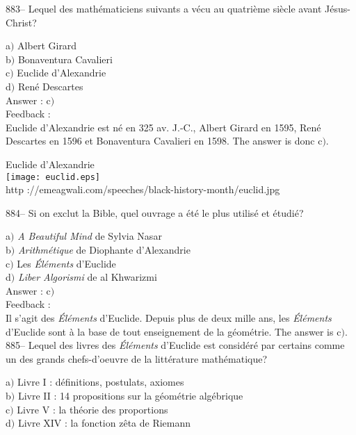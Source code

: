 \documentclass[letterpaper, 12pt]{article}
\begin{document}
883-- Lequel des math\'ematiciens suivants a v\'ecu au quatri\`eme
si\`ecle avant J\'esus-Christ?

a$)$ Albert Girard \\
b$)$ Bonaventura Cavalieri \\
c$)$ Euclide d'Alexandrie \\
d$)$ Ren\'e Descartes\\

Answer : c$)$\\

Feedback :\\
Euclide d'Alexandrie est n\'e en 325 av. J.-C., Albert Girard en 1595,
Ren\'e Descartes en 1596 et Bonaventura Cavalieri en 1598. The answer is
donc c$)$.\\

        \begin{center}
        Euclide d'Alexandrie\\
    \texttt{[image: euclid.eps]}\\
        {\footnotesize http
://emeagwali.com/speeches/black-history-month/euclid.jpg}
    \end{center}

884-- Si on exclut la Bible, quel ouvrage a \'et\'e le plus
utilis\'e et \'etudi\'e?

a$)$ {\sl A Beautiful Mind} de Sylvia Nasar \\
b$)$ {\sl Arithm\'etique} de Diophante d'Alexandrie \\
c$)$ Les {\sl \'El\'ements} d'Euclide \\
d$)$ {\sl Liber Algorismi} de al Khwarizmi\\

Answer : c$)$\\

Feedback :\\
Il s'agit des {\sl \'El\'ements} d'Euclide. Depuis plus de deux mille ans,
les {\sl \'El\'ements} d'Euclide sont \`a la base de tout enseignement de la
g\'eom\'etrie. The answer is c$)$.\\

885-- Lequel des livres des {\sl \'El\'ements} d'Euclide est
consid\'er\'e par certains comme un des grands chefs-d'oeuvre de la
litt\'erature math\'ematique?

a$)$ Livre I : d\'efinitions, postulats, axiomes \\
b$)$ Livre II : 14 propositions sur la g\'eom\'etrie alg\'ebrique \\
c$)$ Livre V : la th\'eorie des proportions \\
d$)$ Livre XIV : la fonction z\^eta de Riemann \\
\end{document}
